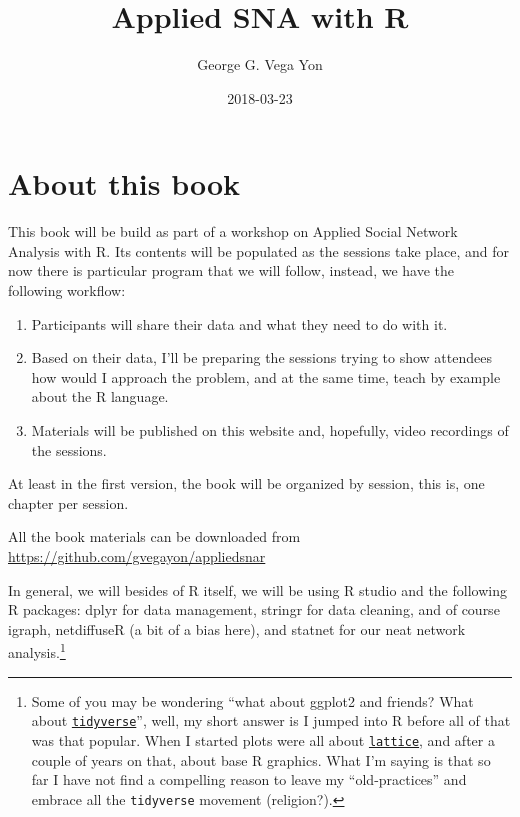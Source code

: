 \documentclass[]{book}
\title{Applied SNA with R}
\author{George G. Vega Yon}
\date{2018-03-23}
\let\rmarkdownfootnote\footnote%
\def\footnote{\protect\rmarkdownfootnote}
\theoremstyle{definition}
\theoremstyle{definition}
\theoremstyle{definition}
\theoremstyle{remark}
\begin{document}
\maketitle

{
\setcounter{tocdepth}{1}
\tableofcontents
}
\renewcommand{\Pr}[1]{\mbox{Pr}\left(#1\right)}
\renewcommand{\exp}[1]{\mbox{exp}\left\{#1\right\}}

\chapter{About this book}\label{about-this-book}

This book will be build as part of a workshop on Applied Social Network
Analysis with R. Its contents will be populated as the sessions take
place, and for now there is particular program that we will follow,
instead, we have the following workflow:

\begin{enumerate}
\def\labelenumi{\arabic{enumi}.}
\item
  Participants will share their data and what they need to do with it.
\item
  Based on their data, I'll be preparing the sessions trying to show
  attendees how would I approach the problem, and at the same time,
  teach by example about the R language.
\item
  Materials will be published on this website and, hopefully, video
  recordings of the sessions.
\end{enumerate}

At least in the first version, the book will be organized by session,
this is, one chapter per session.

All the book materials can be downloaded from
\url{https://github.com/gvegayon/appliedsnar}

In general, we will besides of R itself, we will be using R studio and
the following R packages: dplyr for data management, stringr for data
cleaning, and of course igraph, netdiffuseR (a bit of a bias here), and
statnet for our neat network analysis.\footnote{Some of you may be
  wondering ``what about ggplot2 and friends? What about
  \href{https://www.tidyverse.org/}{\texttt{tidyverse}}'', well, my
  short answer is I jumped into R before all of that was that popular.
  When I started plots were all about
  \href{https://CRAN.R-project.org/package=lattice}{\texttt{lattice}},
  and after a couple of years on that, about base R graphics. What I'm
  saying is that so far I have not find a compelling reason to leave my
  ``old-practices'' and embrace all the \texttt{tidyverse} movement
  (religion?).}
\end{document}
